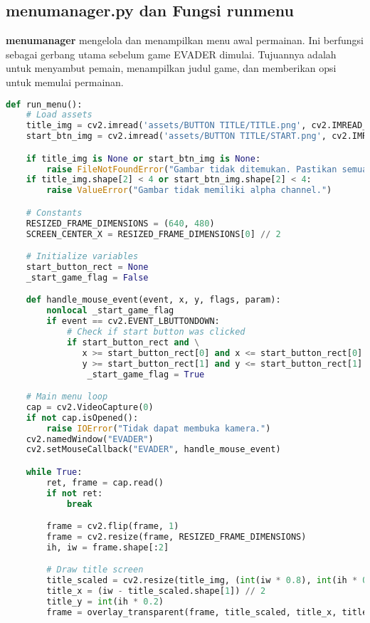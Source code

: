 \documentclass[11pt,a4paper]{article}
\begin{document}
\subsection{menu\textunderscore manager.py dan Fungsi run\textunderscore menu}
\textbf{menu\textunderscore manager} mengelola dan menampilkan menu awal permainan. Ini berfungsi sebagai gerbang utama sebelum game EVADER dimulai. Tujuannya adalah untuk menyambut pemain, menampilkan judul game, dan memberikan opsi untuk memulai permainan.
\begin{lstlisting}[language=Python, caption=menu\textunderscore manager]
def run_menu():
    # Load assets
    title_img = cv2.imread('assets/BUTTON TITLE/TITLE.png', cv2.IMREAD_UNCHANGED)
    start_btn_img = cv2.imread('assets/BUTTON TITLE/START.png', cv2.IMREAD_UNCHANGED)

    if title_img is None or start_btn_img is None:
        raise FileNotFoundError("Gambar tidak ditemukan. Pastikan semua aset ada di direktori yang benar.")
    if title_img.shape[2] < 4 or start_btn_img.shape[2] < 4:
        raise ValueError("Gambar tidak memiliki alpha channel.")

    # Constants
    RESIZED_FRAME_DIMENSIONS = (640, 480)
    SCREEN_CENTER_X = RESIZED_FRAME_DIMENSIONS[0] // 2

    # Initialize variables
    start_button_rect = None
    _start_game_flag = False

    def handle_mouse_event(event, x, y, flags, param):
        nonlocal _start_game_flag
        if event == cv2.EVENT_LBUTTONDOWN:
            # Check if start button was clicked
            if start_button_rect and \
               x >= start_button_rect[0] and x <= start_button_rect[0] + start_button_rect[2] and \
               y >= start_button_rect[1] and y <= start_button_rect[1] + start_button_rect[3]:
                _start_game_flag = True

    # Main menu loop
    cap = cv2.VideoCapture(0)
    if not cap.isOpened():
        raise IOError("Tidak dapat membuka kamera.")
    cv2.namedWindow("EVADER")
    cv2.setMouseCallback("EVADER", handle_mouse_event)

    while True:
        ret, frame = cap.read()
        if not ret:
            break

        frame = cv2.flip(frame, 1)
        frame = cv2.resize(frame, RESIZED_FRAME_DIMENSIONS)
        ih, iw = frame.shape[:2]

        # Draw title screen
        title_scaled = cv2.resize(title_img, (int(iw * 0.8), int(ih * 0.8)), interpolation=cv2.INTER_AREA)
        title_x = (iw - title_scaled.shape[1]) // 2
        title_y = int(ih * 0.2)
        frame = overlay_transparent(frame, title_scaled, title_x, title_y, (title_scaled.shape[1], title_scaled.shape[0]))


\end{lstlisting}
\end{document}
